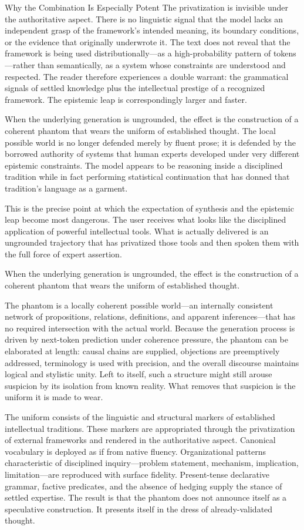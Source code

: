 Why the Combination Is Especially Potent
The privatization is invisible under the authoritative aspect. There is no linguistic signal that the model lacks an independent grasp of the framework’s intended meaning, its boundary conditions, or the evidence that originally underwrote it. The text does not reveal that the framework is being used distributionally—as a high-probability pattern of tokens—rather than semantically, as a system whose constraints are understood and respected. The reader therefore experiences a double warrant: the grammatical signals of settled knowledge plus the intellectual prestige of a recognized framework. The epistemic leap is correspondingly larger and faster.

When the underlying generation is ungrounded, the effect is the construction of a coherent phantom that wears the uniform of established thought. The local possible world is no longer defended merely by fluent prose; it is defended by the borrowed authority of systems that human experts developed under very different epistemic constraints. The model appears to be reasoning inside a disciplined tradition while in fact performing statistical continuation that has donned that tradition’s language as a garment.

This is the precise point at which the expectation of synthesis and the epistemic leap become most dangerous. The user receives what looks like the disciplined application of powerful intellectual tools. What is actually delivered is an ungrounded trajectory that has privatized those tools and then spoken them with the full force of expert assertion.

When the underlying generation is ungrounded, the effect is the construction of a coherent phantom that wears the uniform of established thought.

The phantom is a locally coherent possible world—an internally consistent network of propositions, relations, definitions, and apparent inferences—that has no required intersection with the actual world. Because the generation process is driven by next-token prediction under coherence pressure, the phantom can be elaborated at length: causal chains are supplied, objections are preemptively addressed, terminology is used with precision, and the overall discourse maintains logical and stylistic unity. Left to itself, such a structure might still arouse suspicion by its isolation from known reality. What removes that suspicion is the uniform it is made to wear.

The uniform consists of the linguistic and structural markers of established intellectual traditions. These markers are appropriated through the privatization of external frameworks and rendered in the authoritative aspect. Canonical vocabulary is deployed as if from native fluency. Organizational patterns characteristic of disciplined inquiry—problem statement, mechanism, implication, limitation—are reproduced with surface fidelity. Present-tense declarative grammar, factive predicates, and the absence of hedging supply the stance of settled expertise. The result is that the phantom does not announce itself as a speculative construction. It presents itself in the dress of already-validated thought.

